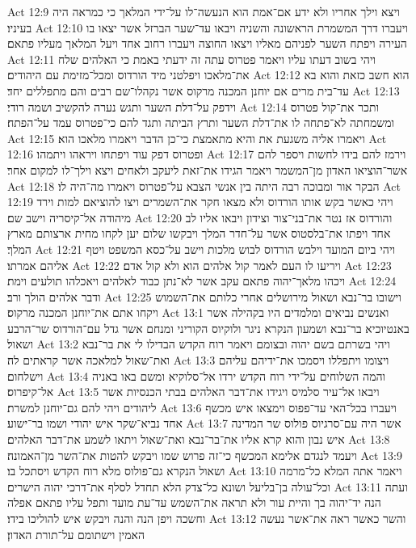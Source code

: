 Act 12:9  ויצא וילך אחריו ולא ידע אם־אמת הוא הנעשה־לו על־ידי המלאך כי כמראה היה בעיניו׃
Act 12:10  ויעברו דרך המשמרת הראשונה והשניה ויבאו עד־שער הברזל אשר יצאו בו העירה ויפתח השער לפניהם מאליו ויצאו החוצה ויעברו רחוב אחד ויעל המלאך מעליו פתאם׃
Act 12:11  ויהי בשוב דעתו עליו ויאמר פטרוס עתה זה ידעתי באמת כי האלהים שלח את־מלאכו ויפלטני מיד הורדוס ומכל־מזימת עם היהודים׃
Act 12:12  הוא חשב כזאת והוא בא עד־בית מרים אם יוחנן המכנה מרקוס אשר נקהלו־שם רבים והם מתפללים יחד׃
Act 12:13  וידפק על־דלת השער ותגש נערה להקשיב ושמה רודי׃
Act 12:14  ותכר את־קול פטרוס ומשמחתה לא־פתחה לו את־דלת השער ותרץ הביתה ותגד להם כי־פטרוס עמד על־הפתח׃
Act 12:15  ויאמרו אליה משגעת את והיא מתאמצת כי־כן הדבר ויאמרו מלאכו הוא׃
Act 12:16  ופטרוס דפק עוד ויפתחו ויראהו ויתמהו׃
Act 12:17  וירמז להם בידו לחשות ויספר להם אשר־הוציאו האדון מן־המשמר ויאמר הגידו את־זאת ליעקב ולאחים ויצא וילך־לו למקום אחר׃
Act 12:18  הבקר אור ומבוכה רבה היתה בין אנשי הצבא על־פטרוס ויאמרו מה־היה לו׃
Act 12:19  ויהי כאשר בקש אותו הורדוס ולא מצאו חקר את־השמרים ויצו להוציאם למות וירד מיהודה אל־קיסריה וישב שם׃
Act 12:20  והורדוס אז נטר את־בני־צור וצידון ויבאו אליו לב אחד ויפתו את־בלסטוס אשר על־חדר המלך ויבקשו שלום יען לקחו מחית ארצותם מארץ המלך׃
Act 12:21  ויהי ביום המועד וילבש הורדוס לבוש מלכות וישב על־כסא המשפט ויטף אליהם אמרתו׃
Act 12:22  ויריעו לו העם לאמר קול אלהים הוא ולא קול אדם׃
Act 12:23  ויכהו מלאך־יהוה פתאם עקב אשר לא־נתן כבוד לאלהים ויאכלהו תולעים וימת׃
Act 12:24  ודבר אלהים הולך ורב׃
Act 12:25  וישובו בר־נבא ושאול מירושלים אחרי כלותם את־השמוש ויקחו אתם את־יוחנן המכנה מרקוס׃
Act 13:1  ואנשים נביאים ומלמדים היו בקהילה אשר באנטיוכיא בר־נבא ושמעון הנקרא ניגר ולוקיוס הקוריני ומנחם אשר גדל עם־הורדוס שר־הרבע ושאול׃
Act 13:2  ויהי בשרתם בשם יהוה ובצומם ויאמר רוח הקדש הבדילו לי את בר־נבא ואת־שאול למלאכה אשר קראתים לה׃
Act 13:3  ויצומו ויתפללו ויסמכו את־ידיהם עליהם וישלחום׃
Act 13:4  והמה השלוחים על־ידי רוח הקדש ירדו אל־סלוקיא ומשם באו באניה אל־קיפרוס׃
Act 13:5  ויבאו אל־עיר סלמיס ויגידו את־דבר האלהים בבתי הכנסיות אשר ליהודים ויהי להם גם־יוחנן למשרת׃
Act 13:6  ויעברו בכל־האי עד־פפוס וימצאו איש מכשף אחד נביא־שקר איש יהודי ושמו בר־ישוע׃
Act 13:7  אשר היה עם־סרגיוס פולוס שר המדינה איש נבון והוא קרא אליו את־בר־נבא ואת־שאול ויתאו לשמע את־דבר האלהים׃
Act 13:8  ויעמד לנגדם אלימא המכשף כי־זה פרוש שמו ויבקש להטות את־השר מן־האמונה׃
Act 13:9  ושאול הנקרא גם־פולוס מלא רוח הקדש ויסתכל בו׃
Act 13:10  ויאמר אתה המלא כל־מרמה וכל־עולה בן־בליעל ושונא כל־צדק הלא תחדל לסלף את־דרכי יהוה הישרים׃
Act 13:11  ועתה הנה יד־יהוה בך והיית עור ולא תראה את־השמש עד־עת מועד ותפל עליו פתאם אפלה וחשכה ויפן הנה והנה ויבקש איש להוליכו בידו׃
Act 13:12  והשר כאשר ראה את־אשר נעשה האמין וישתומם על־תורת האדון׃
